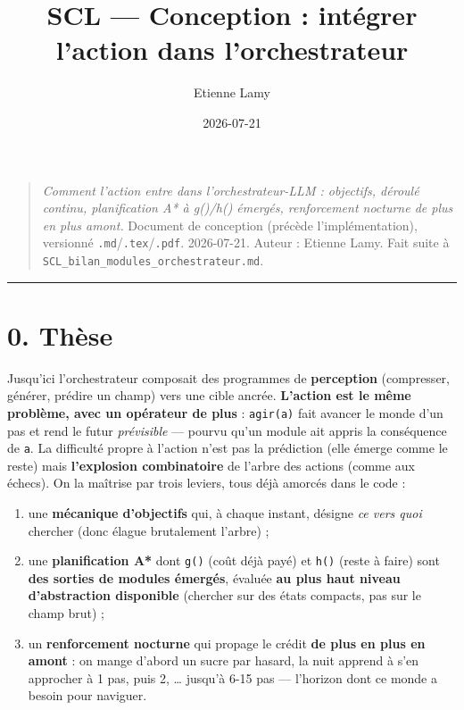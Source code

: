 \documentclass[
  french,
  11pt,
]{article}
\title{SCL --- Conception : intégrer l'action dans l'orchestrateur}
\author{Etienne Lamy}
\date{2026-07-21}
\providecommand{\tightlist}{%
  \setlength{\itemsep}{0pt}\setlength{\parskip}{0pt}}
\begin{document}
\maketitle

{
\hypersetup{linkcolor=black}
\setcounter{tocdepth}{2}
\tableofcontents
}
\begin{quote}
\emph{Comment l'action entre dans l'orchestrateur-LLM : objectifs,
déroulé continu, planification A* à g()/h() émergés, renforcement
nocturne de plus en plus amont.} Document de conception (précède
l'implémentation), versionné \texttt{.md}/\texttt{.tex}/\texttt{.pdf}.
2026-07-21. Auteur : Etienne Lamy. Fait suite à
\texttt{SCL\_bilan\_modules\_orchestrateur.md}.
\end{quote}

\begin{center}\rule{0.5\linewidth}{0.5pt}\end{center}

\section{0. Thèse}\label{thuxe8se}

Jusqu'ici l'orchestrateur composait des programmes de
\textbf{perception} (compresser, générer, prédire un champ) vers une
cible ancrée. \textbf{L'action est le même problème, avec un opérateur
de plus} : \texttt{agir(a)} fait avancer le monde d'un pas et rend le
futur \emph{prévisible} --- pourvu qu'un module ait appris la
conséquence de \texttt{a}. La difficulté propre à l'action n'est pas la
prédiction (elle émerge comme le reste) mais \textbf{l'explosion
combinatoire} de l'arbre des actions (comme aux échecs). On la maîtrise
par trois leviers, tous déjà amorcés dans le code :

\begin{enumerate}
\def\labelenumi{\arabic{enumi}.}
\tightlist
\item
  une \textbf{mécanique d'objectifs} qui, à chaque instant, désigne
  \emph{ce vers quoi} chercher (donc élague brutalement l'arbre) ;
\item
  une \textbf{planification A*} dont \texttt{g()} (coût déjà payé) et
  \texttt{h()} (reste à faire) sont \textbf{des sorties de modules
  émergés}, évaluée \textbf{au plus haut niveau d'abstraction
  disponible} (chercher sur des états compacts, pas sur le champ brut) ;
\item
  un \textbf{renforcement nocturne} qui propage le crédit \textbf{de
  plus en plus en amont} : on mange d'abord un sucre par hasard, la nuit
  apprend à s'en approcher à 1 pas, puis 2, \ldots{} jusqu'à 6-15 pas
  --- l'horizon dont ce monde a besoin pour naviguer.
\end{enumerate}
\end{document}
